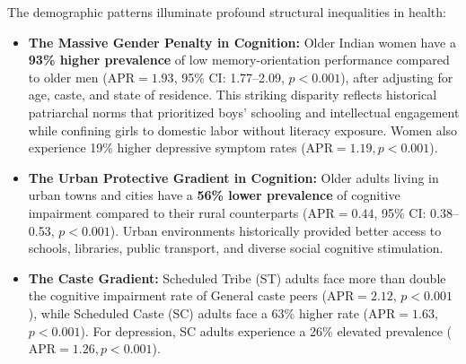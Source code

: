 The demographic patterns illuminate profound structural inequalities in health:
\begin{itemize}
    \item \textbf{The Massive Gender Penalty in Cognition:} Older Indian women have a \textbf{93\% higher prevalence} of low memory-orientation performance compared to older men ($\text{APR} = 1.93$, 95\% CI: 1.77--2.09, $p < 0.001$), after adjusting for age, caste, and state of residence. This striking disparity reflects historical patriarchal norms that prioritized boys' schooling and intellectual engagement while confining girls to domestic labor without literacy exposure. Women also experience 19\% higher depressive symptom rates ($\text{APR} = 1.19, p < 0.001$).
    \item \textbf{The Urban Protective Gradient in Cognition:} Older adults living in urban towns and cities have a \textbf{56\% lower prevalence} of cognitive impairment compared to their rural counterparts ($\text{APR} = 0.44$, 95\% CI: 0.38--0.53, $p < 0.001$). Urban environments historically provided better access to schools, libraries, public transport, and diverse social cognitive stimulation.
    \item \textbf{The Caste Gradient:} Scheduled Tribe (ST) adults face more than double the cognitive impairment rate of General caste peers ($\text{APR} = 2.12$, $p < 0.001$), while Scheduled Caste (SC) adults face a 63\% higher rate ($\text{APR} = 1.63$, $p < 0.001$). For depression, SC adults experience a 26\% elevated prevalence ($\text{APR} = 1.26, p < 0.001$).
\end{itemize}
